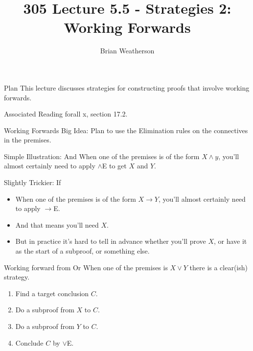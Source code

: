 \documentclass[
  ignorenonframetext,
]{beamer}
\title{305 Lecture 5.5 - Strategies 2: Working Forwards}
\author{Brian Weatherson}
\date{}
\providecommand{\tightlist}{%
  \setlength{\itemsep}{0pt}\setlength{\parskip}{0pt}}
\renewcommand{\,}{\text{, }}
\begin{document}
\frame{\titlepage}

\begin{frame}{Plan}
\protect\hypertarget{plan}{}
This lecture discusses strategies for constructing proofs that involve
working forwards.
\end{frame}

\begin{frame}{Associated Reading}
\protect\hypertarget{associated-reading}{}
forall x, section 17.2.
\end{frame}

\begin{frame}{Working Forwards}
\protect\hypertarget{working-forwards}{}
Big Idea: Plan to use the Elimination rules on the connectives in the
premises.
\end{frame}

\begin{frame}{Simple Illustration: And}
\protect\hypertarget{simple-illustration-and}{}
When one of the premises is of the form \(X \wedge y\), you'll almost
certainly need to apply \(\wedge\)E to get \(X\) and \(Y\).
\end{frame}

\begin{frame}{Slightly Trickier: If}
\protect\hypertarget{slightly-trickier-if}{}
\begin{itemize}[<+->]
\tightlist
\item
  When one of the premises is of the form \(X \rightarrow Y\), you'll
  almost certainly need to apply \(\rightarrow\)E.
\item
  And that means you'll need \(X\).
\item
  But in practice it's hard to tell in advance whether you'll prove
  \(X\), or have it as the start of a subproof, or something else.
\end{itemize}
\end{frame}

\begin{frame}{Working forward from Or}
\protect\hypertarget{working-forward-from-or}{}
When one of the premises is \(X \vee Y\) there is a clear(ish) strategy.

\begin{enumerate}
\tightlist
\item
  Find a target conclusion \(C\).
\item
  Do a subproof from \(X\) to \(C\).
\item
  Do a subproof from \(Y\) to \(C\).
\item
  Conclude \(C\) by \(\vee\)E.
\end{enumerate}
\end{frame}
\end{document}
